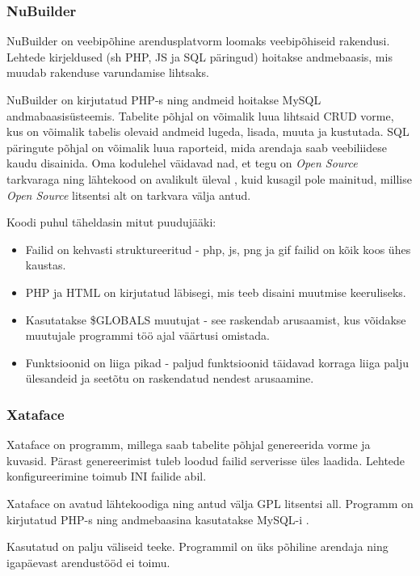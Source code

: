 \documentclass[a4paper,12pt]{article} %
\begin{document}
\subsubsection{NuBuilder}
NuBuilder on veebipõhine arendusplatvorm loomaks veebipõhiseid rakendusi. Lehtede kirjeldused (sh PHP, JS ja SQL päringud) hoitakse andmebaasis, mis muudab rakenduse varundamise lihtsaks.\par
NuBuilder on kirjutatud PHP-s ning andmeid hoitakse MySQL andmabaasisüsteemis. Tabelite põhjal on võimalik luua lihtsaid CRUD vorme, kus on võimalik tabelis olevaid andmeid lugeda, lisada, muuta ja kustutada. SQL päringute põhjal on võimalik luua raporteid, mida arendaja saab veebiliidese kaudu disainida.
Oma kodulehel väidavad nad, et tegu on \textit{Open Source} tarkvaraga ning lähtekood on avalikult üleval \cite{nuBuilderGitHub}, kuid kusagil pole mainitud, millise \textit{Open Source} litsentsi alt on tarkvara välja antud.\par
Koodi puhul täheldasin mitut puudujääki:
\begin{itemize}
\item Failid on kehvasti struktureeritud - php, js, png ja gif failid on kõik koos ühes kaustas.
\item PHP ja HTML on kirjutatud läbisegi, mis teeb disaini muutmise keeruliseks.
\item Kasutatakse \$GLOBALS muutujat - see raskendab arusaamist, kus võidakse muutujale programmi töö ajal väärtusi omistada.
\item Funktsioonid on liiga pikad - paljud funktsioonid täidavad korraga liiga palju ülesandeid ja seetõtu on raskendatud nendest arusaamine.
\end{itemize}
\cite{nuBuilder}
\subsubsection{Xataface}
Xataface on programm, millega saab tabelite põhjal genereerida vorme ja kuvasid. Pärast genereerimist tuleb loodud failid serverisse üles laadida. Lehtede konfigureerimine toimub INI failide abil.\cite{Xataface}\par
Xataface on avatud lähtekoodiga ning antud välja GPL litsentsi all. Programm on kirjutatud PHP-s \cite{PHP} ning andmebaasina kasutatakse MySQL-i \cite{MySQL}.\par
Kasutatud on palju väliseid teeke. Programmil on üks põhiline arendaja ning igapäevast arendustööd ei toimu. \cite{XatafaceGitHub}
\end{document}

